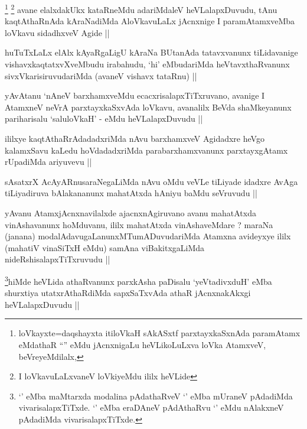 
\begin{artha}
\footnote{loVkayxte=daqshayxta itiloVkaH sAkASxtf parxtayxkaSxnAda
  paramAtamx eMdathaR ``\stext'' eMdu jAcnxnigaLu heVLikoLuLxva loVka
  AtamxveV, beVreyeMdilalx,}
\footnote{I loVkavuLaLxvaneV loVkiyeMdu ililx heVLide}
avane elalxdakUkx kataRneMdu adariMdaleV heVLalapxDuvudu, tAnu
kaqtAthaRnAda kAraNadiMda AloVkavuLaLx jAcnxnige I paramAtamxveMba
loVkavu sidadhxveV Agide ||
\end{artha}


\begin{artha}
huTuTxLaLx elAlx kAyaRgaLigU kAraNa BUtanAda tatavxvanunx tiLidavanige
vishavxkaqtatxvXveMbudu irabahudu, `hi' eMbudariMda heVtavxthaRvanunx
sivxVkarisiruvudariMda (avaneV vishavx tataRnu) ||
\end{artha}


\begin{artha}
yAvAtanu `nAneV barxhamxveMdu ecacxrisalapxTiTxruvano, avanige I
AtamxneV neVrA parxtayxkaSxvAda loVkavu, avanalilx BeVda shaMkeyanunx
pariharisalu `saluloVkaH' - eMdu heVLalapxDuvudu ||
\end{artha}


\begin{artha}
ililxye kaqtAthaRrAdadadxriMda nAvu barxhamxveV Agidadxre heVgo
kalamxSavu kaLedu hoVdadadxriMda parabarxhamxvanunx parxtayxgAtamx
rUpadiMda ariyuvevu ||
\end{artha}

\begin{artha}
sAsatxrX AcAyARnusaraNegaLiMda nAvu oMdu veVLe tiLiyade idadxre AvAga
tiLiyadiruva bAlakananunx mahatAtxda hAniyu baMdu seVruvudu ||
\end{artha}

\begin{artha}
yAvanu AtamxjAcnxnavilalxde ajacnxnAgiruvano avanu mahatAtxda
vinAshavanunx hoMduvanu, ililx mahatAtxda vinAshaveMdare ? maraNa
(janana) modalAdavugaLanunxMTumADuvudariMda Atamxna avideyxye ililx
(mahatiV vinaSiTxH eMdu) samAna viBakitxgaLiMda
nideRshisalapxTiTxruvudu ||
\end{artha}

\begin{artha}
\footnote{`\stext' eMba maMtarxda modalina pAdathaRveV `\stext' eMba
  mUraneV pAdadiMda vivarisalapxTiTxde. `\stext' eMba eraDAneV
  pAdAthaRvu `\stext' eMdu nAlakxneV pAdadiMda vivarisalapxTiTxde.}hiMde heVLida athaRvanunx parxkAsha paDisalu `yeVtadivxduH'
eMba shurxtiya utatxrAthaRdiMda sapxSaTxvAda athaR jAcnxnakAkxgi
heVLalapxDuvudu ||
\end{artha}

